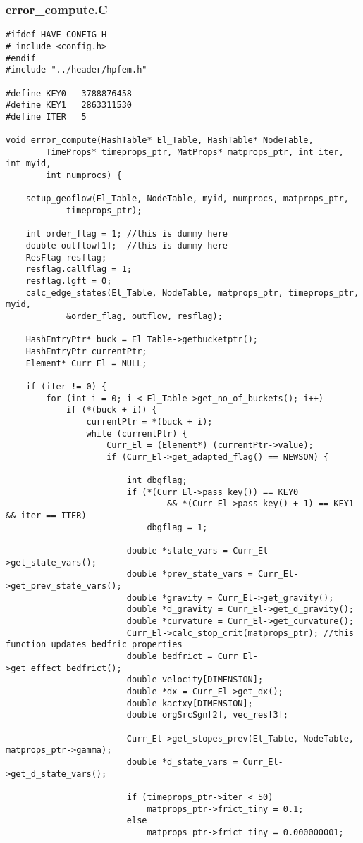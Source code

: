 \documentclass[a4paper,10pt]{article}
\begin{document}
\subsubsection{error\_compute.C}
\begin{lstlisting}
#ifdef HAVE_CONFIG_H
# include <config.h>
#endif
#include "../header/hpfem.h"

#define KEY0   3788876458
#define KEY1   2863311530
#define ITER   5

void error_compute(HashTable* El_Table, HashTable* NodeTable,
		TimeProps* timeprops_ptr, MatProps* matprops_ptr, int iter, int myid,
		int numprocs) {

	setup_geoflow(El_Table, NodeTable, myid, numprocs, matprops_ptr,
			timeprops_ptr);

	int order_flag = 1;	//this is dummy here
	double outflow[1];	//this is dummy here
	ResFlag resflag;
	resflag.callflag = 1;
	resflag.lgft = 0;
	calc_edge_states(El_Table, NodeTable, matprops_ptr, timeprops_ptr, myid,
			&order_flag, outflow, resflag);

	HashEntryPtr* buck = El_Table->getbucketptr();
	HashEntryPtr currentPtr;
	Element* Curr_El = NULL;

	if (iter != 0) {
		for (int i = 0; i < El_Table->get_no_of_buckets(); i++)
			if (*(buck + i)) {
				currentPtr = *(buck + i);
				while (currentPtr) {
					Curr_El = (Element*) (currentPtr->value);
					if (Curr_El->get_adapted_flag() == NEWSON) {

						int dbgflag;
						if (*(Curr_El->pass_key()) == KEY0
								&& *(Curr_El->pass_key() + 1) == KEY1 && iter == ITER)
							dbgflag = 1;

						double *state_vars = Curr_El->get_state_vars();
						double *prev_state_vars = Curr_El->get_prev_state_vars();
						double *gravity = Curr_El->get_gravity();
						double *d_gravity = Curr_El->get_d_gravity();
						double *curvature = Curr_El->get_curvature();
						Curr_El->calc_stop_crit(matprops_ptr); //this function updates bedfric properties
						double bedfrict = Curr_El->get_effect_bedfrict();
						double velocity[DIMENSION];
						double *dx = Curr_El->get_dx();
						double kactxy[DIMENSION];
						double orgSrcSgn[2], vec_res[3];

						Curr_El->get_slopes_prev(El_Table, NodeTable, matprops_ptr->gamma);
						double *d_state_vars = Curr_El->get_d_state_vars();

						if (timeprops_ptr->iter < 50)
							matprops_ptr->frict_tiny = 0.1;
						else
							matprops_ptr->frict_tiny = 0.000000001;


\end{lstlisting}
\end{document}
